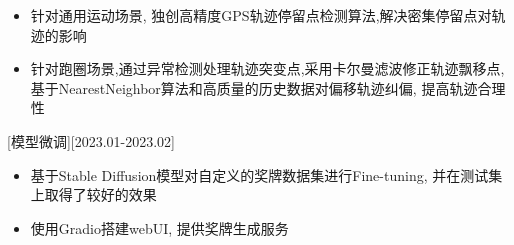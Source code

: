 \documentclass{resume}
\begin{document}
\begin{itemize}
    \item 针对通用运动场景, 独创高精度GPS轨迹停留点检测算法,解决密集停留点对轨迹的影响
    \item 针对跑圈场景,通过异常检测处理轨迹突变点,采用卡尔曼滤波修正轨迹飘移点,基于NearestNeighbor算法和高质量的历史数据对偏移轨迹纠偏, 提高轨迹合理性
\end{itemize}
[模型微调][2023.01-2023.02]
\begin{itemize}
    \item 基于Stable Diffusion模型对自定义的奖牌数据集进行Fine-tuning, 并在测试集上取得了较好的效果
    \item 使用Gradio搭建webUI, 提供奖牌生成服务
\end{itemize}
\end{document}
